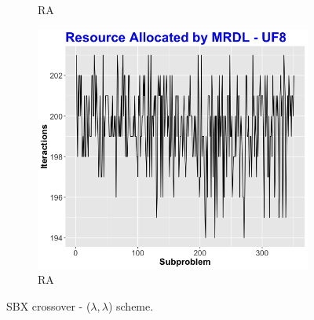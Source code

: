 \begin{figure}[!t]
\begin{subfigure}[b]{0.33\textwidth}
		\caption{RA}
	\end{subfigure}
	\begin{subfigure}[b]{0.33\textwidth}
		\centering
		\includegraphics[width=1\textwidth, height=1\textwidth]{images/Ra-mrdl-uf8}
		\caption{RA}
	\end{subfigure}
	\caption{SBX crossover - ($\lambda, \lambda$) scheme.}
	\label{RAs - UF8}
	
\end{figure}

